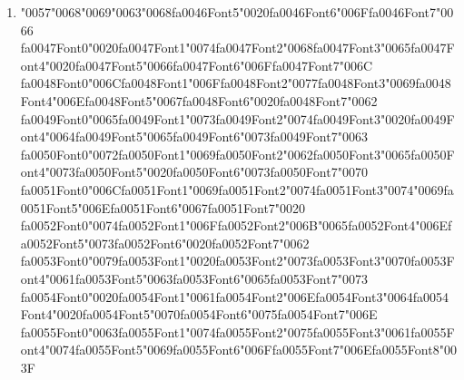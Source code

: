 \documentclass[11pt]{article}
\begin{document}
\begin{enumerate}[leftmargin=*]
  \item {\char"0057}{\char"0068}{\char"0069}{\char"0063}{\char"0068}{\csname fa0046Font5\endcsname\char"0020}{\csname fa0046Font6\endcsname\char"006F}{\csname fa0046Font7\endcsname\char"0066} {\csname fa0047Font0\endcsname\char"0020}{\csname fa0047Font1\endcsname\char"0074}{\csname fa0047Font2\endcsname\char"0068}{\csname fa0047Font3\endcsname\char"0065}{\csname fa0047Font4\endcsname\char"0020}{\csname fa0047Font5\endcsname\char"0066}{\csname fa0047Font6\endcsname\char"006F}{\csname fa0047Font7\endcsname\char"006C} {\csname fa0048Font0\endcsname\char"006C}{\csname fa0048Font1\endcsname\char"006F}{\csname fa0048Font2\endcsname\char"0077}{\csname fa0048Font3\endcsname\char"0069}{\csname fa0048Font4\endcsname\char"006E}{\csname fa0048Font5\endcsname\char"0067}{\csname fa0048Font6\endcsname\char"0020}{\csname fa0048Font7\endcsname\char"0062} {\csname fa0049Font0\endcsname\char"0065}{\csname fa0049Font1\endcsname\char"0073}{\csname fa0049Font2\endcsname\char"0074}{\csname fa0049Font3\endcsname\char"0020}{\csname fa0049Font4\endcsname\char"0064}{\csname fa0049Font5\endcsname\char"0065}{\csname fa0049Font6\endcsname\char"0073}{\csname fa0049Font7\endcsname\char"0063} {\csname fa0050Font0\endcsname\char"0072}{\csname fa0050Font1\endcsname\char"0069}{\csname fa0050Font2\endcsname\char"0062}{\csname fa0050Font3\endcsname\char"0065}{\csname fa0050Font4\endcsname\char"0073}{\csname fa0050Font5\endcsname\char"0020}{\csname fa0050Font6\endcsname\char"0073}{\csname fa0050Font7\endcsname\char"0070} {\csname fa0051Font0\endcsname\char"006C}{\csname fa0051Font1\endcsname\char"0069}{\csname fa0051Font2\endcsname\char"0074}{\csname fa0051Font3\endcsname\char"0074}{\char"0069}{\csname fa0051Font5\endcsname\char"006E}{\csname fa0051Font6\endcsname\char"0067}{\csname fa0051Font7\endcsname\char"0020} {\csname fa0052Font0\endcsname\char"0074}{\csname fa0052Font1\endcsname\char"006F}{\csname fa0052Font2\endcsname\char"006B}{\char"0065}{\csname fa0052Font4\endcsname\char"006E}{\csname fa0052Font5\endcsname\char"0073}{\csname fa0052Font6\endcsname\char"0020}{\csname fa0052Font7\endcsname\char"0062} {\csname fa0053Font0\endcsname\char"0079}{\csname fa0053Font1\endcsname\char"0020}{\csname fa0053Font2\endcsname\char"0073}{\csname fa0053Font3\endcsname\char"0070}{\csname fa0053Font4\endcsname\char"0061}{\csname fa0053Font5\endcsname\char"0063}{\csname fa0053Font6\endcsname\char"0065}{\csname fa0053Font7\endcsname\char"0073} {\csname fa0054Font0\endcsname\char"0020}{\csname fa0054Font1\endcsname\char"0061}{\csname fa0054Font2\endcsname\char"006E}{\csname fa0054Font3\endcsname\char"0064}{\csname fa0054Font4\endcsname\char"0020}{\csname fa0054Font5\endcsname\char"0070}{\csname fa0054Font6\endcsname\char"0075}{\csname fa0054Font7\endcsname\char"006E} {\csname fa0055Font0\endcsname\char"0063}{\csname fa0055Font1\endcsname\char"0074}{\csname fa0055Font2\endcsname\char"0075}{\csname fa0055Font3\endcsname\char"0061}{\csname fa0055Font4\endcsname\char"0074}{\csname fa0055Font5\endcsname\char"0069}{\csname fa0055Font6\endcsname\char"006F}{\csname fa0055Font7\endcsname\char"006E}{\csname fa0055Font8\endcsname\char"003F}

\end{enumerate}
\end{document}
